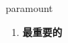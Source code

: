 
\begin{frame}
{\huge paramount}
\begin{center}
\begin{enumerate}\Large
  \item \textbf{最重要的}
\end{enumerate}
\end{center}
\end{frame}
